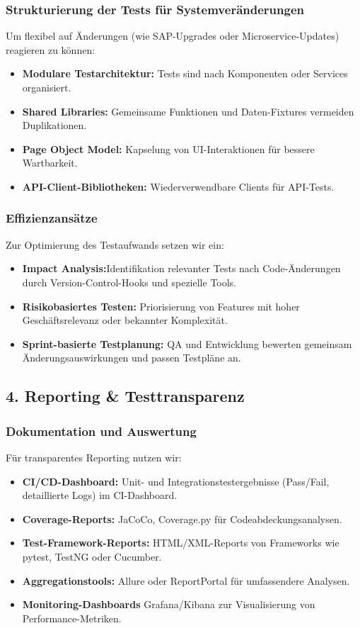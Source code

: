 \subsubsection{Strukturierung der Tests für Systemveränderungen}
Um flexibel auf Änderungen (wie SAP-Upgrades oder Microservice-Updates) reagieren zu können:
\begin{itemize}
    \item \textbf{Modulare Testarchitektur:} Tests sind nach Komponenten oder Services organisiert.
    \item \textbf{Shared Libraries:} Gemeinsame Funktionen und Daten-Fixtures vermeiden Duplikationen.
    \item \textbf{Page Object Model:} Kapselung von UI-Interaktionen für bessere Wartbarkeit.
    \item \textbf{API-Client-Bibliotheken:} Wiederverwendbare Clients für API-Tests.
\end{itemize}
\subsubsection{Effizienzansätze}
Zur Optimierung des Testaufwands setzen wir ein:
\begin{itemize}
    \item \textbf{Impact Analysis:}Identifikation relevanter Tests nach Code-Änderungen durch Version-Control-Hooks und spezielle Tools.
    \item \textbf{Risikobasiertes Testen:} Priorisierung von Features mit hoher Geschäftsrelevanz oder bekannter Komplexität.
    \item \textbf{Sprint-basierte Testplanung:} QA und Entwicklung bewerten gemeinsam Änderungsauswirkungen und passen Testpläne an.
\end{itemize}
\subsection{4. Reporting \& Testtransparenz}
\subsubsection{Dokumentation und Auswertung}
Für transparentes Reporting nutzen wir:
\begin{itemize}
    \item \textbf{CI/CD-Dashboard:} Unit- und Integrationstestergebnisse (Pass/Fail, detaillierte Logs) im CI-Dashboard.
    \item \textbf{Coverage-Reports:} JaCoCo, Coverage.py für Codeabdeckungsanalysen.
    \item \textbf{Test-Framework-Reports:} HTML/XML-Reports von Frameworks wie pytest, TestNG oder Cucumber.
    \item \textbf{Aggregationstools:} Allure oder ReportPortal für umfassendere Analysen.
    \item \textbf{Monitoring-Dashboards} Grafana/Kibana zur Visualisierung von Performance-Metriken.
\end{itemize}
